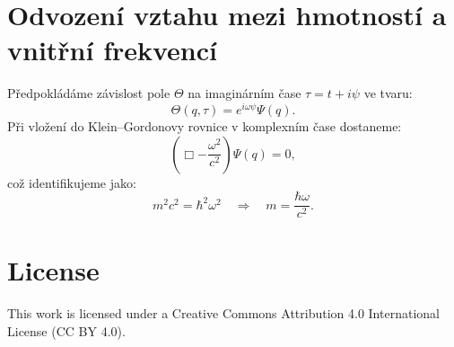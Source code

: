 \documentclass{article}
\begin{document}
\section*{Odvození vztahu mezi hmotností a vnitřní frekvencí}

Předpokládáme závislost pole \(\Theta\) na imaginárním čase \(\tau = t + i\psi\) ve tvaru:
\[
\Theta(q, \tau) = e^{i\omega \psi} \Psi(q).
\]
Při vložení do Klein–Gordonovy rovnice v komplexním čase dostaneme:
\[
\left( \Box - \frac{\omega^2}{c^2} \right) \Psi(q) = 0,
\]
což identifikujeme jako:
\[
m^2 c^2 = \hbar^2 \omega^2 \quad \Rightarrow \quad m = \frac{\hbar \omega}{c^2}.
\]


\section*{License}
This work is licensed under a Creative Commons Attribution 4.0 International License (CC BY 4.0).
\end{document}
